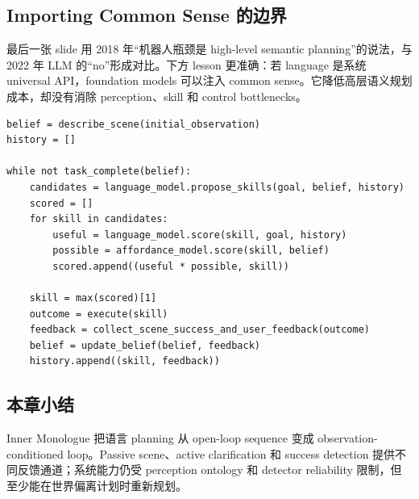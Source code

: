 \subsection{Importing Common Sense 的边界}

最后一张 slide 用 2018 年“机器人瓶颈是 high-level semantic planning”的说法，与 2022 年 LLM 的“no”形成对比。下方 lesson 更准确：若 language 是系统 universal API，foundation models 可以注入 common sense。它降低高层语义规划成本，却没有消除 perception、skill 和 control bottlenecks。



\begin{lstlisting}[caption={SayCan + Inner Monologue 的 closed-loop planner},label={lst:closed-loop-planner}]
belief = describe_scene(initial_observation)
history = []

while not task_complete(belief):
    candidates = language_model.propose_skills(goal, belief, history)
    scored = []
    for skill in candidates:
        useful = language_model.score(skill, goal, history)
        possible = affordance_model.score(skill, belief)
        scored.append((useful * possible, skill))

    skill = max(scored)[1]
    outcome = execute(skill)
    feedback = collect_scene_success_and_user_feedback(outcome)
    belief = update_belief(belief, feedback)
    history.append((skill, feedback))
\end{lstlisting}

\subsection{本章小结}

Inner Monologue 把语言 planning 从 open-loop sequence 变成 observation-conditioned loop。Passive scene、active clarification 和 success detection 提供不同反馈通道；系统能力仍受 perception ontology 和 detector reliability 限制，但至少能在世界偏离计划时重新规划。

